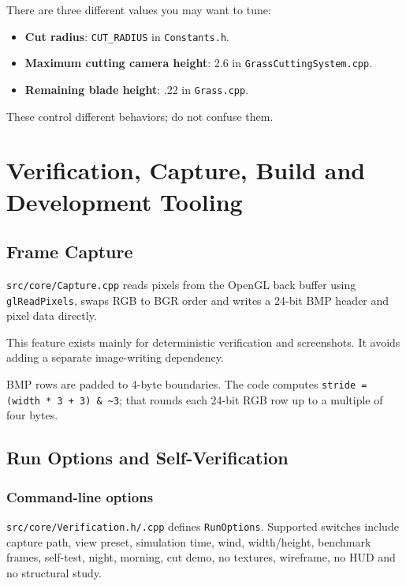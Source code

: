 \documentclass[11pt,a4paper,openany]{book}
\newcommand{\code}[1]{\texttt{#1}}
\newcommand{\file}[1]{\nolinkurl{#1}}
\begin{document}
\begin{editbox}
	There are three different values you may want to tune:
	\begin{itemize}
		\item \textbf{Cut radius}: \code{CUT_RADIUS} in \file{Constants.h}.
		\item \textbf{Maximum cutting camera height}: 2.6 in \file{GrassCuttingSystem.cpp}.
		\item \textbf{Remaining blade height}: .22 in \file{Grass.cpp}.
	\end{itemize}
	These control different behaviors; do not confuse them.
\end{editbox}

\part{Verification, Capture, Build and Development Tooling}

\chapter{Frame Capture}
\file{src/core/Capture.cpp} reads pixels from the OpenGL back buffer using \code{glReadPixels}, swaps RGB to BGR order and writes a 24-bit BMP header and pixel data directly.

This feature exists mainly for deterministic verification and screenshots. It avoids adding a separate image-writing dependency.

\begin{beginnerbox}
	BMP rows are padded to 4-byte boundaries. The code computes \code{stride = (width * 3 + 3) \& \textasciitilde3}; that rounds each 24-bit RGB row up to a multiple of four bytes.
\end{beginnerbox}

\chapter{Run Options and Self-Verification}
\section{Command-line options}
\file{src/core/Verification.h/.cpp} defines \code{RunOptions}. Supported switches include capture path, view preset, simulation time, wind, width/height, benchmark frames, self-test, night, morning, cut demo, no textures, wireframe, no HUD and no structural study.
\end{document}
